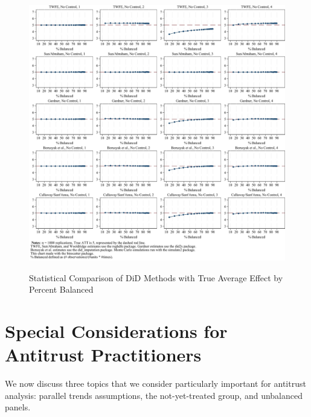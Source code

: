 \documentclass[12pt]{article}
\begin{document}
\begin{figure}[H]
    \centering
    \caption{Statistical Comparison of DiD Methods with True Average Effect by Percent Balanced}
    \includegraphics[width=6in]{Figures/Binscatters by Percent Balanced Common Scale (Small).jpg}
    \label{fig:estimators-balanced}
\end{figure}
\section{Special Considerations for Antitrust Practitioners} \label{sec:antitrust}
We now discuss three topics that we consider particularly important for antitrust analysis: parallel trends assumptions, the not-yet-treated group, and unbalanced panels.
\end{document}
